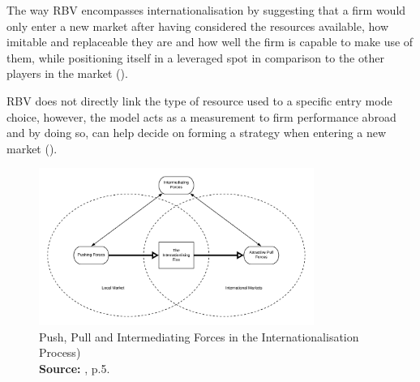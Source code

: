 \documentclass[11pt,a4paper]{article}
\newcommand*{\captionsource}[2]{%
  \caption[{#1}]{%
    #1%
    \\\hspace{\linewidth}%
    \textbf{Source:} #2%
  }%
}
\begin{document}
{The way RBV encompasses internationalisation by suggesting that a firm would only enter a new market after having considered the resources available, how imitable and replaceable they are and how well the firm is capable to make use of them, while positioning itself in a leveraged spot in comparison to the other players in the market (\cite{ruzzierResourcebasedApproachInternationalisation2006}).  \par
RBV does not directly link the type of resource used to a specific entry mode choice, however, the model acts as a measurement to firm performance abroad and by doing so, can help decide on forming a strategy when entering a new market (\cite{tulungResourceAvailabilityFirm2017}). 



\newpage





  \vspace{5mm}
\begin{figure}[H]
	\centering
  \includegraphics[width=0.8\textwidth, scale=0.1]{figures/fig_pull_push_forces}
  \vspace{5mm}
    \captionsetup{justification=centering,margin=2cm}
      \captionsource{Push, Pull and Intermediating Forces in the Internationalisation Process)}{\cite{etemadInternationalizationSmallMediumsized2004}, p.5.}
	\label{fig:pull_push_forces}
\end{figure}

}
\end{document}
